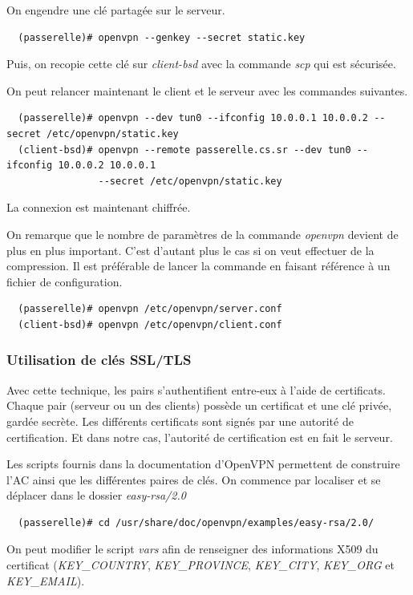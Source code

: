 \documentclass[a4paper]{article}
\begin{document}
On engendre une clé partagée sur le serveur.
\begin{verbatim}
  (passerelle)# openvpn --genkey --secret static.key
\end{verbatim}

Puis, on recopie cette clé sur \textit{client-bsd} avec la commande \textit{scp}
qui est sécurisée.

On peut relancer maintenant le client et le serveur avec les commandes suivantes.
\begin{verbatim}
  (passerelle)# openvpn --dev tun0 --ifconfig 10.0.0.1 10.0.0.2 --secret /etc/openvpn/static.key
  (client-bsd)# openvpn --remote passerelle.cs.sr --dev tun0 --ifconfig 10.0.0.2 10.0.0.1 
                --secret /etc/openvpn/static.key
\end{verbatim}

La connexion est maintenant chiffrée.

On remarque que le nombre de paramètres de la commande \textit{openvpn} devient
de plus en plus important. C'est d'autant plus le cas si on veut effectuer 
de la compression. 
Il est préférable de lancer la commande en faisant référence à un fichier de configuration.
\begin{verbatim}
  (passerelle)# openvpn /etc/openvpn/server.conf
  (client-bsd)# openvpn /etc/openvpn/client.conf
\end{verbatim}

\subsubsection{Utilisation de clés SSL/TLS}

Avec cette technique, les pairs s'authentifient entre-eux à l'aide de certificats.
Chaque pair (serveur ou un des clients) possède un certificat et une clé privée, gardée secrète.
Les différents certificats sont signés par une autorité de certification. Et dans notre cas,
l'autorité de certification est en fait le serveur.

Les scripts fournis dans la documentation d'OpenVPN permettent de construire l'AC ainsi
que les différentes paires de clés.
On commence par localiser et se déplacer dans le dossier \textit{easy-rsa/2.0}
\begin{verbatim}
  (passerelle)# cd /usr/share/doc/openvpn/examples/easy-rsa/2.0/
\end{verbatim}

On peut modifier le script \textit{vars} afin de renseigner des informations X509 du
certificat (\textit{KEY\_COUNTRY}, \textit{KEY\_PROVINCE}, \textit{KEY\_CITY}, 
\textit{KEY\_ORG} et \textit{KEY\_EMAIL}).
\end{document}
